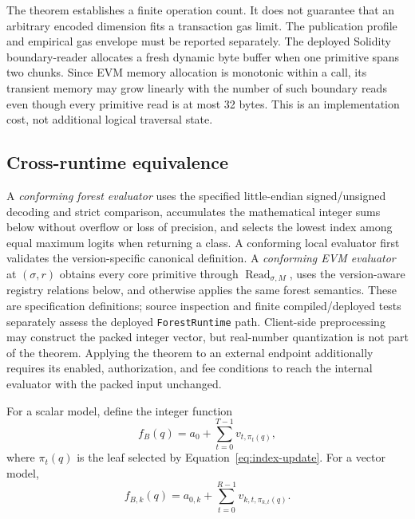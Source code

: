 \begin{remark}
The theorem establishes a finite operation count.  It does not guarantee that
an arbitrary encoded dimension fits a transaction gas limit.  The publication
profile and empirical gas envelope must be reported separately.  The deployed
Solidity boundary-reader allocates a fresh dynamic byte buffer when one
primitive spans two chunks.  Since EVM memory allocation is monotonic within a
call, its transient memory may grow linearly with the number of such boundary
reads even though every primitive read is at most 32 bytes.  This is an
implementation cost, not additional logical traversal state.
\end{remark}

\subsection{Cross-runtime equivalence}

A \emph{conforming forest evaluator} uses the specified little-endian
signed/unsigned decoding and strict comparison, accumulates the mathematical
integer sums below without overflow or loss of precision, and selects the
lowest index among equal maximum logits when returning a class. A conforming
local evaluator first validates the version-specific canonical definition. A
\emph{conforming EVM evaluator} at $(\sigma,r)$ obtains every core primitive
through $\operatorname{Read}_{\sigma,M}$, uses the version-aware registry
relations below, and otherwise applies the same forest semantics. These are
specification definitions; source inspection and finite compiled/deployed
tests separately assess the deployed \texttt{ForestRuntime} path. Client-side
preprocessing may construct the packed integer vector, but real-number
quantization is not part of the theorem. Applying the theorem to an external
endpoint additionally requires its enabled, authorization, and fee conditions
to reach the internal evaluator with the packed input unchanged.

For a scalar model, define the integer function
\begin{equation}
  f_B(q)=a_0+\sum_{t=0}^{T-1}v_{t,\pi_t(q)},
  \label{eq:scalar-function}
\end{equation}
where $\pi_t(q)$ is the leaf selected by
Equation~\ref{eq:index-update}.  For a vector model,
\begin{equation}
  f_{B,k}(q)=a_{0,k}+\sum_{t=0}^{R-1}v_{k,t,\pi_{k,t}(q)}.
  \label{eq:vector-function}
\end{equation}

